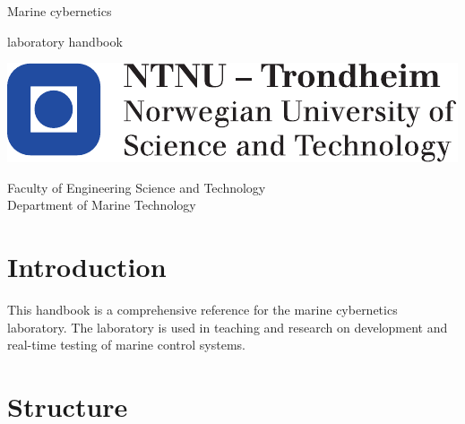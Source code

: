 \documentclass[a4paper,twoside,english]{report}
\begin{document}
\thispagestyle{empty}

\vspace*{3cm}

\begin{center}
{\LARGE{}Marine cybernetics}
\par\end{center}{\LARGE \par}

\begin{center}
{\LARGE{}laboratory handbook }
\par\end{center}{\LARGE \par}

\begin{flushleft}
\vfill{}
\par\end{flushleft}

\begin{flushleft}
\includegraphics[scale=0.6]{fig/NTNU_logo}
\par\end{flushleft}

Faculty of Engineering Science and Technology\\
Department of Marine Technology

\clearpage{}\thispagestyle{empty}\vspace*{3cm}

\clearpage{}

\setcounter{page}{1}

\vspace*{3cm}


\section*{Introduction}

This handbook is a comprehensive reference for the marine cybernetics
laboratory. The laboratory is used in teaching and research on development
and real-time testing of marine control systems.

\section*{Structure}
\end{document}
